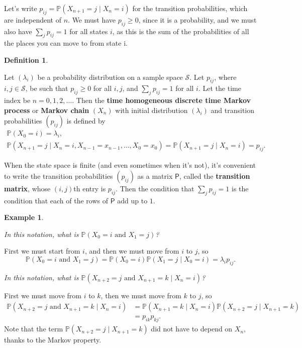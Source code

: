 \documentclass[
  a4paper,
]{article}
\theoremstyle{definition}
\newtheorem{definition}{Definition}[section]
\theoremstyle{definition}
\newtheorem{example}{Example}[section]
\theoremstyle{definition}
\theoremstyle{remark}
\begin{document}
Let's write \(p_{ij} = \mathbb P(X_{n+1} = j \mid X_n = i)\) for the transition probabilities, which are independent of \(n\).
We must have \(p_{ij} \geq 0\), since it is a probability, and we must also have \(\sum_j p_{ij} = 1\) for all states \(i\), as this is the sum of the probabilities of all the places you can move to from state i.

\begin{definition}
\protect\hypertarget{def:def-thmc}{}\label{def:def-thmc}

Let \((\lambda_i)\) be a probability distribution on a sample space \(\mathcal S\). Let \(p_{ij}\), where \(i,j \in \mathcal S\), be such that \(p_{ij} \geq 0\) for all \(i,j\), and \(\sum_j p_{ij} = 1\) for all \(i\). Let the time index be \(n = 0,1,2,\dots\). Then the \textbf{time homogeneous discrete time Markov process} or \textbf{Markov chain} \((X_n)\) with initial distribution \((\lambda_i)\) and transition probabilities \((p_{ij})\) is defined by
\begin{gather*}
    \mathbb P(X_0 = i) = \lambda_i ,\\
    \mathbb P(X_{n+1} = j \mid X_n = i, X_{n-1} = x_{n-1}, \dots, X_0 = x_0) = \mathbb P(X_{n+1} = j \mid X_n = i) =  p_{ij}  . \end{gather*}

\end{definition}

When the state space is finite (and even sometimes when it's not), it's convenient to write the transition probabilities \((p_{ij})\) as a matrix \(\mathsf P\), called the \textbf{transition matrix}, whose \((i,j)\)th entry is \(p_{ij}\). Then the condition that \(\sum_j p_{ij} = 1\) is the condition that each of the rows of \(\mathsf P\) add up to \(1\).

\begin{example}
\protect\hypertarget{exm:mcex}{}\label{exm:mcex}

\emph{In this notation, what is \(\mathbb P(X_0 = i \text{ and } X_1 = j)\)?}

First we must start from \(i\), and then we must move from \(i\) to \(j\), so
\[ \mathbb P(X_0 = i \text{ and } X_1 = j) = \mathbb P(X_0 = i)\mathbb P(X_1 = j \mid X_0 = i) = \lambda_i p_{ij} . \]

\emph{In this notation, what is \(\mathbb P(X_{n+2} = j \text{ and } X_{n+1} = k \mid X_n = i)\)?}

First we must move from \(i\) to \(k\), then we must move from \(k\) to \(j\), so
\begin{align*}
\mathbb P(X_{n+2} = j \text{ and } X_{n+1} = k \mid X_n = i)
&= \mathbb P(X_{n+1} = k \mid X_n = i)\mathbb P(X_{n+2} = j \mid X_{n+1} = k) \\
&= p_{ik}p_{kj} .
\end{align*}
Note that the term \(\mathbb P(X_{n+2} = j \mid X_{n+1} = k)\) did not have to depend on \(X_n\), thanks to the Markov property.

\end{example}
\end{document}
